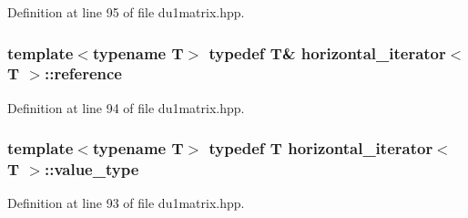 Definition at line 95 of file du1matrix.\-hpp.

\hypertarget{classhorizontal__iterator_a286f6a9e1498bd52e0ddcf8b1bff78f8}{
\subsubsection[{reference}]{\setlength{\rightskip}{0pt plus 5cm}template$<$typename T$>$ typedef T\& {\bf horizontal\-\_\-iterator}$<$ T $>$\-::{\bf reference}}}\label{classhorizontal__iterator_a286f6a9e1498bd52e0ddcf8b1bff78f8}


Definition at line 94 of file du1matrix.\-hpp.

\hypertarget{classhorizontal__iterator_aecda8c123296e42db62e8cc706428f71}{
\subsubsection[{value\-\_\-type}]{\setlength{\rightskip}{0pt plus 5cm}template$<$typename T$>$ typedef T {\bf horizontal\-\_\-iterator}$<$ T $>$\-::{\bf value\-\_\-type}}}\label{classhorizontal__iterator_aecda8c123296e42db62e8cc706428f71}


Definition at line 93 of file du1matrix.\-hpp.



